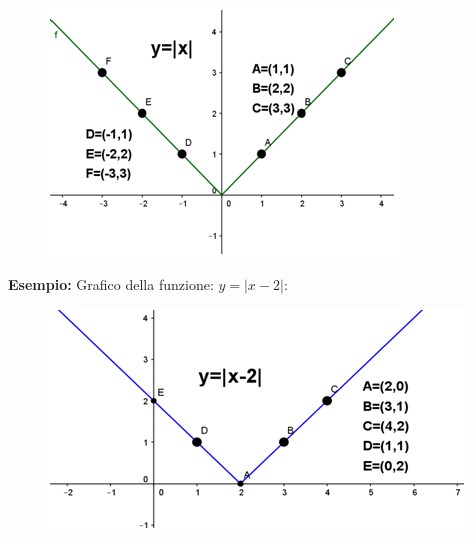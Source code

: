 \begin{figure}[h]
\begin{inaccessibleblock}[TODO]
\centering
\includegraphics[width=0.9\linewidth]{img/imm2} %
\end{inaccessibleblock}
\label{fig:abs_imm2}
\end{figure}

\textbf{Esempio: } Grafico della funzione: $y=|x-2|$:

\begin{figure}[h]
\begin{inaccessibleblock}[TODO]
\centering
\includegraphics[width=0.9\linewidth]{img/imm3} %
\end{inaccessibleblock}
\label{fig:abs_imm3}
\end{figure}

